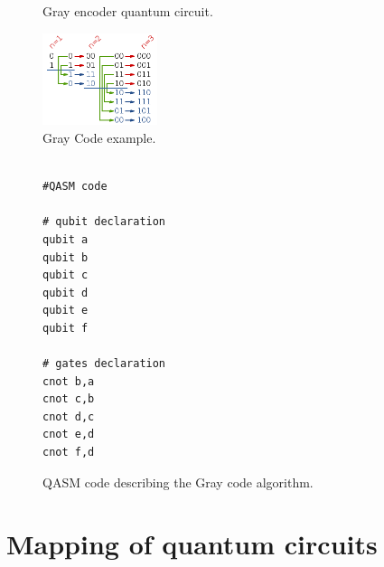 \begin{figure}
    \centering


\label{fig:circuit_example}
\caption{Gray encoder quantum circuit.}
\end{figure}

\begin{figure}[htbp]
\centering
\includegraphics[width=0.3\textwidth]{figures/gray_code.png}
\caption{\label{fig:orgae8c095}
Gray Code example.}
\end{figure}

\begin{figure}
\centering
\begin{minipage}{.45\textwidth}

\begin{verbatim}

#QASM code

# qubit declaration
qubit a
qubit b
qubit c
qubit d
qubit e
qubit f

# gates declaration
cnot b,a
cnot c,b
cnot d,c
cnot e,d
cnot f,d

\end{verbatim}

\caption{QASM code describing the Gray code algorithm.}
\end{minipage}
\end{figure}

\section*{Mapping of quantum circuits}
\label{sec:org1b470b8}

